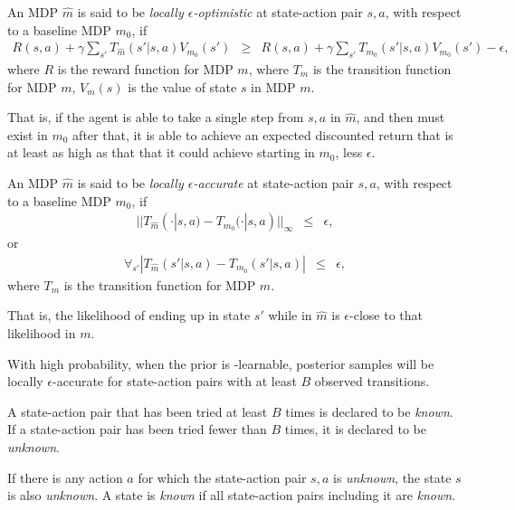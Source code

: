 \begin{defn}
\label{sec:boss:defn:local-opt}

An MDP $\hat m$ is said to be \emph{locally $\epsilon$-optimistic} at state-action pair $s, a$, with respect to a baseline MDP $m_0$, if
\begin{eqnarray}
R(s,a)+\gamma \sum_{s'} T_{\hat m}(s'|s,a) V_{m_0}(s')
&\geq&R(s,a)+\gamma \sum_{s'} T_{m_0}(s'|s,a) V_{m_0}(s') - \epsilon,
\end{eqnarray}
where $R$ is the reward function for MDP $m$, where $T_{m}$ is the transition function for MDP $m$, $V_m(s)$ is the value of state $s$ in MDP $m$.

That is, if the agent is able to take a single step from $s,a$ in $\hat m$, and then must exist in $m_0$ after that, it is able to achieve an expected discounted return that is at least as high as that that it could achieve starting in $m_0$, less $\epsilon$.

\end{defn}

\begin{defn}
\label{sec:boss:defn:local-acc}

An MDP $\hat m$ is said to be \emph{locally $\epsilon$-accurate} at state-action pair $s, a$, with respect to a baseline MDP $m_0$, if
\begin{eqnarray}
||T_{\hat m}(\cdot|s,a) - T_{m_0}(\cdot|s,a)||_\infty &\leq& \epsilon,
\end{eqnarray}
or
\begin{eqnarray}
\forall_{s'} \left|T_{\hat m}(s'|s,a) - T_{m_0}(s'|s,a)\right| &\leq& \epsilon,
\end{eqnarray}
where $T_{m}$ is the transition function for MDP $m$.

That is, the likelihood of ending up in state $s'$ while in $\hat m$ is $\epsilon$-close to that likelihood in $m$.

With high probability, when the prior is \bed-learnable, posterior samples will be locally $\epsilon$-accurate for state-action pairs with at least $B$ observed transitions.

\end{defn}

\begin{defn}

A state-action pair that has been tried at least $B$ times is declared to be \emph{known}. If a state-action pair has been tried fewer than $B$ times, it is declared to be \emph{unknown}.

If there is any action $a$ for which the state-action pair $s,a$ is \emph{unknown}, the state $s$ is also \emph{unknown}. A state is \emph{known} if all state-action pairs including it are \emph{known}.
\end{defn}

